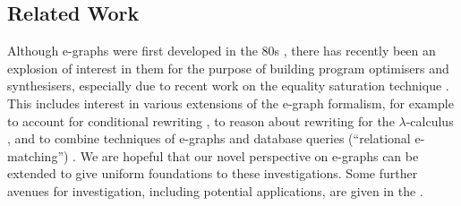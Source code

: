 %

\subsection{Related Work}

Although e-graphs were first developed in the 80s \cite{nelson1980techniques}, there has recently been an explosion of interest in them for the purpose of building program optimisers and synthesisers, especially due to recent work on the equality saturation technique \cite{10.1145/1594834.1480915, flatt2022small, EggPaper,flatt_small_2022}.  This includes interest in various extensions of the e-graph formalism, for example to account for conditional rewriting \cite{singher2023colored},  to reason about rewriting for the $\lambda$-calculus \cite{koehler2022sketchguided},  and to combine techniques of e-graphs and database queries (``relational e-matching'') \cite{zhang_relational_2022}. 
We are hopeful that our novel perspective on e-graphs can be extended to give uniform foundations to these investigations.  
Some further avenues for investigation, including potential applications, are given in the .

